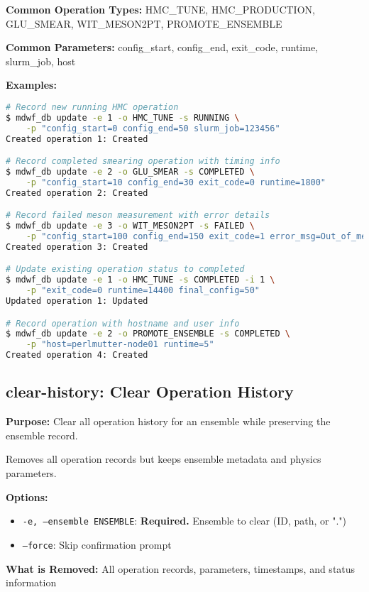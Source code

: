 \documentclass{article}
\begin{document}
\textbf{Common Operation Types:}
HMC\_TUNE, HMC\_PRODUCTION, GLU\_SMEAR, WIT\_MESON2PT, PROMOTE\_ENSEMBLE

\textbf{Common Parameters:}
config\_start, config\_end, exit\_code, runtime, slurm\_job, host

\textbf{Examples:}
\begin{lstlisting}[language=bash]
# Record new running HMC operation
$ mdwf_db update -e 1 -o HMC_TUNE -s RUNNING \
    -p "config_start=0 config_end=50 slurm_job=123456"
Created operation 1: Created

# Record completed smearing operation with timing info
$ mdwf_db update -e 2 -o GLU_SMEAR -s COMPLETED \
    -p "config_start=10 config_end=30 exit_code=0 runtime=1800"
Created operation 2: Created

# Record failed meson measurement with error details
$ mdwf_db update -e 3 -o WIT_MESON2PT -s FAILED \
    -p "config_start=100 config_end=150 exit_code=1 error_msg=Out_of_memory"
Created operation 3: Created

# Update existing operation status to completed
$ mdwf_db update -e 1 -o HMC_TUNE -s COMPLETED -i 1 \
    -p "exit_code=0 runtime=14400 final_config=50"
Updated operation 1: Updated

# Record operation with hostname and user info
$ mdwf_db update -e 2 -o PROMOTE_ENSEMBLE -s COMPLETED \
    -p "host=perlmutter-node01 runtime=5"
Created operation 4: Created
\end{lstlisting}

\subsection{clear-history: Clear Operation History}

\textbf{Purpose:} Clear all operation history for an ensemble while preserving the ensemble record.

Removes all operation records but keeps ensemble metadata and physics parameters.

\textbf{Options:}
\begin{itemize}
\item \texttt{-e, --ensemble ENSEMBLE}: \textbf{Required.} Ensemble to clear (ID, path, or ".")
\item \texttt{--force}: Skip confirmation prompt
\end{itemize}

\textbf{What is Removed:}
All operation records, parameters, timestamps, and status information
\end{document}
